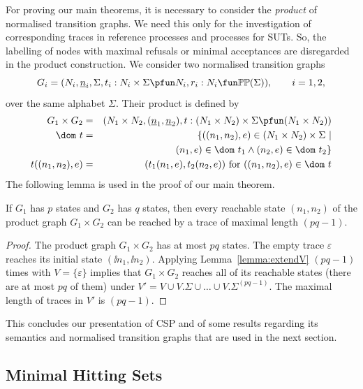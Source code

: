 For proving our main theorems, it is necessary to consider the \emph{product}
of normalised transition graphs. We need this only for the investigation of
corresponding traces in reference processes and processes for SUTs. So, the
labelling of nodes with maximal refusals or minimal acceptances are
disregarded in the product construction. We consider two normalised
transition graphs
\[
G_i = ( N_i, \ii n_i, \Sigma, t_i : N_i\times\Sigma \pfun N_i, r_i : N_i \fun \mathbb{P}\mathbb{P}(\Sigma)),\qquad i = 1,2,
\]
over the same alphabet $\Sigma$. Their product is defined by
%
\begin{eqnarray}
G_1\times G_2 & = & (N_1\times N_2,(\ii n_1,\ii n_2), t:(N_1\times N_2)\times\Sigma\pfun (N_1\times N_2))
\\
\dom~t & = & \{ ((n_1,n_2),e)\in (N_1\times N_2)\times\Sigma~|   \nonumber
\\ & & \tabc
(n_1,e)\in\dom~t_1\wedge
(n_2,e) \in\dom~t_2    \}
\\
t((n_1,n_2),e) & = & (t_1(n_1,e),t_2(n_2,e))\ \text{for $((n_1,n_2),e)\in\dom~t$}
\end{eqnarray}
%
The following lemma is used in the proof of our main theorem.
%
\begin{lemma}\label{lemma:reachproduc}
If $G_1$ has $p$ states and $G_2$ has $q$ states, then every reachable state
$(n_1,n_2)$ of the product graph $G_1\times G_2$ can be reached by a trace
of maximal length $(pq-1)$.
\end{lemma}
\begin{proof}
The product graph $G_1\times G_2$ has at most $pq$ states. The empty trace $\varepsilon$
reaches its initial state $(\ii n_1,\ii n_2)$. Applying Lemma~\ref{lemma:extendV}
$(pq-1)$ times with $V=\{\varepsilon \}$ implies that $G_1\times G_2$ reaches
all of its reachable states (there are at most $pq$ of them) under
$V' = V \cup V.\Sigma\cup\dots \cup V.\Sigma^{(pq-1)}$. The maximal length of traces in
$V'$ is $(pq-1)$.
\xbox
\end{proof}
%
This concludes our presentation of CSP and of some results regarding its
semantics and normalised transition graphs that are used in the next section.

\subsection{Minimal Hitting Sets}
\label{sec:hit}


